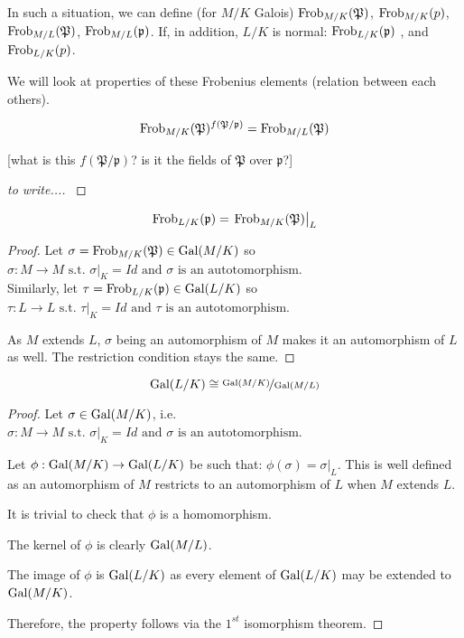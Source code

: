 In such a situation, we can define (for $M/K$ Galois)
$\text{Frob}_{M/K}(\mathfrak{P})$, 
$\text{Frob}_{M/K}(p)$, 
$\text{Frob}_{M/L}(\mathfrak{P})$, 
$\text{Frob}_{M/L}(\mathfrak{p})$.
If, in addition, $L/K$ is normal:
$\text{Frob}_{L/K}(\mathfrak{p})$ , and 
$\text{Frob}_{L/K}(p)$.
\cite[p.99]{AlgebraicNumberFields}

We will look at properties of these Frobenius elements (relation between each others).

\begin{property}
	$$
	\text{Frob}_{M/K}(\mathfrak{P})^{f(\mathfrak{P}/\mathfrak{p})} = \text{Frob}_{M/L}(\mathfrak{P})
	$$
	
	[what is this $f(\mathfrak{P}/\mathfrak{p})$? is it the fields of $\mathfrak{P}$ over $\mathfrak{p}$?]
\end{property}
\begin{proof}
[to write...]
\cite[p.99]{AlgebraicNumberFields}
\end{proof}

\begin{property}
	$$
	\text{Frob}_{L/K}(\mathfrak{p}) = \left. \text{Frob}_{M/K}(\mathfrak{P}) \right|_L
	$$
\end{property}
\begin{proof}
	Let $\sigma = \text{Frob}_{M/K}(\mathfrak{P}) \in \text{Gal}(M/K)$ so 
	$\sigma: M \to M \text{ s.t. } \left. \sigma \right|_K = Id \text{ and } \sigma \text{ is an autotomorphism}$.\\
	Similarly, let $\tau = \text{Frob}_{L/K}(\mathfrak{p}) \in \text{Gal}(L/K)$ so 
	$\tau: L \to L \text{ s.t. } \left. \tau \right|_K = Id \text{ and } \tau \text{ is an autotomorphism}$.
	
	As $M$ extends $L$, $\sigma$ being an automorphism of $M$ makes it an automorphism of $L$ as well.
	The restriction condition stays the same.
\end{proof}


\begin{property}
	$$
	\text{Gal}(L/K) \cong \nicefrac{\text{Gal}(M/K)}{\text{Gal}(M/L)}
	$$
\end{property}
\begin{proof}
	Let $\sigma \in \text{Gal}(M/K)$, i.e. $\sigma: M \to M \text{ s.t. } \left. \sigma \right|_K = Id \text{ and } \sigma \text{ is an autotomorphism}$.
	
	Let $\phi: \text{Gal}(M/K) \to \text{Gal}(L/K)$ be such that:
	$\phi(\sigma) = \left. \sigma \right|_L$.
	This is well defined as an automorphism of $M$ restricts to an automorphism of $L$ when $M$ extends $L$.
	
	It is trivial to check that $\phi$ is a homomorphism.
	
	The kernel of $\phi$ is clearly $\text{Gal}(M/L)$.
	
	The image of $\phi$ is $\text{Gal}(L/K)$ as every element of $\text{Gal}(L/K)$ may be extended to $\text{Gal}(M/K)$.
	
	Therefore, the property follows via the $1^{st}$ isomorphism theorem.
\end{proof}

